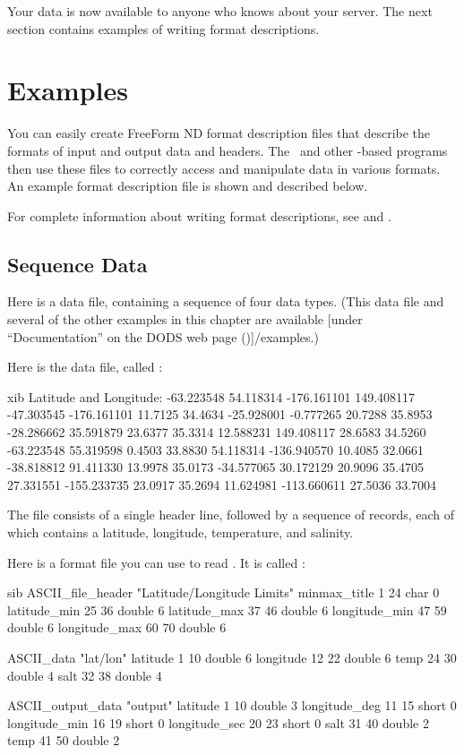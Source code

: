 Your data is now available to anyone who knows about your server.
The next section contains examples of writing format descriptions.

\section{Examples}

You can easily create FreeForm ND format description files that
describe the formats of input and output data and headers. The \ffs\ 
and other \ffnd -based programs then use these files to correctly
access and manipulate data in various formats. An example format
description file is shown and described below.

For complete information about writing format descriptions, see
 and .

\subsection{Sequence Data}

Here is a data file, containing a sequence of four data types.  (This
data file and several of the other examples in this chapter are
available [under ``Documentation'' on the DODS web page
(\DODShomeUrl)]{\DODShomeUrl/examples}.)

Here is the data file, called
:

\begin{vcode}{xib}
Latitude and Longitude:   -63.223548 54.118314  -176.161101 149.408117
-47.303545 -176.161101 11.7125 34.4634
-25.928001   -0.777265 20.7288 35.8953
-28.286662   35.591879 23.6377 35.3314
 12.588231  149.408117 28.6583 34.5260
-63.223548   55.319598  0.4503 33.8830
 54.118314 -136.940570 10.4085 32.0661
-38.818812   91.411330 13.9978 35.0173
-34.577065   30.172129 20.9096 35.4705
 27.331551 -155.233735 23.0917 35.2694
 11.624981 -113.660611 27.5036 33.7004
\end{vcode}

The file consists of a single header line, followed by a sequence of
records, each of which contains a latitude, longitude, temperature,
and salinity.

Here is a format file you can use to read .  It is
called \xlink{\lit{ffsimple.fmt}}{\DODShomeUrl/examples/ffsimple.fmt}:

\begin{vcode}{sib}
ASCII_file_header "Latitude/Longitude Limits"
minmax_title 1 24 char 0
latitude_min 25 36 double 6
latitude_max 37 46 double 6
longitude_min 47 59 double 6
longitude_max 60 70 double 6

ASCII_data "lat/lon"
latitude 1 10 double 6
longitude 12 22 double 6
temp 24 30 double 4
salt 32 38 double 4

ASCII_output_data "output"
latitude 1 10 double 3
longitude_deg 11 15 short 0
longitude_min 16 19 short 0
longitude_sec 20 23 short 0
salt 31 40 double 2
temp 41 50 double 2
\end{vcode}

